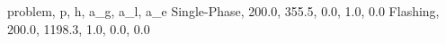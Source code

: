 problem, p, h, a_g, a_l, a_e
Single-Phase, 200.0, 355.5, 0.0, 1.0, 0.0
Flashing, 200.0, 1198.3, 1.0, 0.0, 0.0